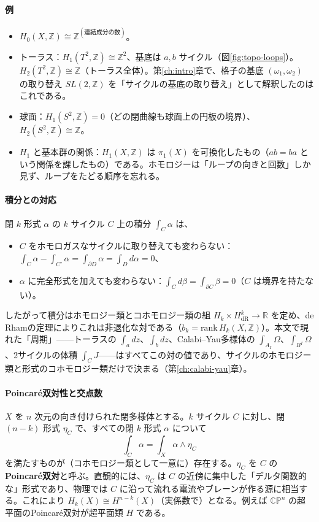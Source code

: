 \documentclass[uplatex, dvipdfmx, book]{jsbook}
\begin{document}
\paragraph{例}
\begin{itemize}
    \item $H_0(X, \mathbb{Z}) \cong \mathbb{Z}^{(\text{連結成分の数})}$。
    \item トーラス：$H_1(T^2, \mathbb{Z}) \cong \mathbb{Z}^2$、基底は $a, b$ サイクル（図\ref{fig:topo-loops}）。$H_2(T^2, \mathbb{Z}) \cong \mathbb{Z}$（トーラス全体）。第\ref{ch:intro}章で、格子の基底 $(\omega_1, \omega_2)$ の取り替え $SL(2, \mathbb{Z})$ を「サイクルの基底の取り替え」として解釈したのはこれである。
    \item 球面：$H_1(S^2, \mathbb{Z}) = 0$（どの閉曲線も球面上の円板の境界）、$H_2(S^2, \mathbb{Z}) \cong \mathbb{Z}$。
    \item $H_1$ と基本群の関係：$H_1(X, \mathbb{Z})$ は $\pi_1(X)$ を可換化したもの（$ab = ba$ という関係を課したもの）である。ホモロジーは「ループの向きと回数」しか見ず、ループをたどる順序を忘れる。
\end{itemize}

\paragraph{積分との対応}
閉 $k$ 形式 $\alpha$ の $k$ サイクル $C$ 上の積分 $\int_C \alpha$ は、
\begin{itemize}
    \item $C$ をホモロガスなサイクルに取り替えても変わらない：$\int_{C} \alpha - \int_{C'} \alpha = \int_{\partial D}\alpha = \int_D d\alpha = 0$、
    \item $\alpha$ に完全形式を加えても変わらない：$\int_C d\beta = \int_{\partial C}\beta = 0$（$C$ は境界を持たない）。
\end{itemize}
したがって積分はホモロジー類とコホモロジー類の組 $H_k \times H^k_{\mathrm{dR}} \to \mathbb{R}$ を定め、de Rhamの定理によりこれは非退化な対である（$b_k = \mathrm{rank}\, H_k(X, \mathbb{Z})$）。本文で現れた「周期」——トーラスの $\int_a dz$、$\int_b dz$、Calabi--Yau多様体の $\int_{A_I}\Omega$、$\int_{B^I}\Omega$、2サイクルの体積 $\int_C J$——はすべてこの対の値であり、サイクルのホモロジー類と形式のコホモロジー類だけで決まる（第\ref{ch:calabi-yau}章）。

\paragraph{Poincar\'e双対性と交点数}
$X$ を $n$ 次元の向き付けられた閉多様体とする。$k$ サイクル $C$ に対し、閉 $(n - k)$ 形式 $\eta_C$ で、すべての閉 $k$ 形式 $\alpha$ について
\begin{equation}
    \int_C \alpha = \int_X \alpha \wedge \eta_C
\end{equation}
を満たすものが（コホモロジー類として一意に）存在する。$\eta_C$ を $C$ の\textbf{Poincar\'e双対}と呼ぶ。直観的には、$\eta_C$ は $C$ の近傍に集中した「デルタ関数的な」形式であり、物理では $C$ に沿って流れる電流やブレーンが作る源に相当する。これにより $H_k(X) \cong H^{n-k}(X)$（実係数で）となる。例えば $\mathbb{CP}^n$ の超平面のPoincar\'e双対が超平面類 $H$ である。
\end{document}
